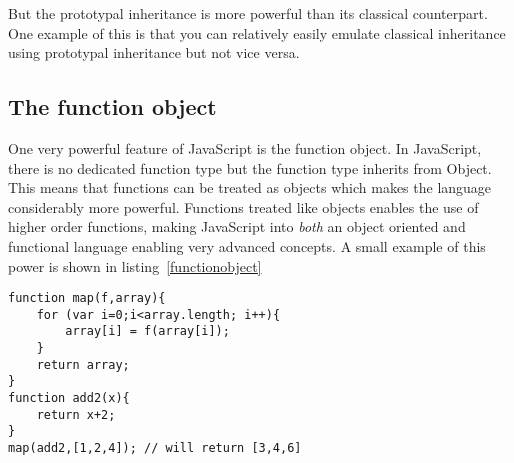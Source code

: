 But the prototypal inheritance is more powerful than its classical counterpart. One example of this is that you can relatively easily emulate classical inheritance using prototypal inheritance but not vice versa.



\subsection{The function object}
One very powerful feature of JavaScript is the function object. In JavaScript, there is no dedicated function type but the function type inherits from Object. This means that functions can be treated as objects which makes the language considerably more powerful. Functions treated like objects enables the use of higher order functions, making JavaScript into \emph{both} an object oriented and functional language enabling very advanced concepts. A small example of this power is shown in listing~\ref{functionobject}

\begin{lstlisting}[caption=Inheritance,label=inheritance]
function map(f,array){
	for (var i=0;i<array.length; i++){
		array[i] = f(array[i]);
	}
	return array;
}
function add2(x){
	return x+2;
}
map(add2,[1,2,4]); // will return [3,4,6]
\end{lstlisting}	